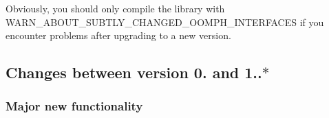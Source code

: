 Obviously, you should only compile the library with {\ttfamily W\+A\+R\+N\+\_\+\+A\+B\+O\+U\+T\+\_\+\+S\+U\+B\+T\+L\+Y\+\_\+\+C\+H\+A\+N\+G\+E\+D\+\_\+\+O\+O\+M\+P\+H\+\_\+\+I\+N\+T\+E\+R\+F\+A\+C\+ES} if you encounter problems after upgrading to a new version.



\hypertarget{index_zero_point_nine_to_one_point_zero}{}\subsection{Changes between version 0. and 1..$\ast$}\label{index_zero_point_nine_to_one_point_zero}
\hypertarget{index_new_functionality_one_point_zero}{}\subsubsection{Major new functionality}\label{index_new_functionality_one_point_zero}

